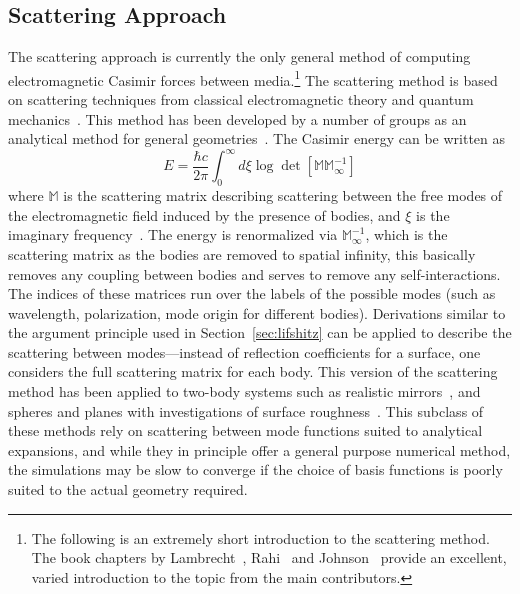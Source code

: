 \subsection{Scattering Approach}
\label{sec:scattering}
The scattering approach is currently the only general method of computing 
electromagnetic Casimir forces between media.\footnote{The following is an extremely short introduction to the scattering
method.  The book chapters by Lambrecht\etal~\cite{Lambrecht2011}, Rahi\etal~\cite{Rahi2011} and Johnson\etal~\cite{Johnson2011} 
provide an excellent, varied introduction to the topic from the main contributors.}
The scattering method 
is based on scattering techniques from classical electromagnetic theory and quantum mechanics~\cite{Rahi2009}.
This method has been developed by a number of groups as an analytical method for general geometries~\cite{Emig2004, Lambrecht2006,
Kenneth2006, Emig2007,
MaiaNeto2008,Canaguier-Durand2012,Rahi2009}.  
The Casimir energy can be written as 
\begin{equation}
  E = \frac{\hbar c}{2\pi}\int_{0}^\infty d\xi \log\det[\mathbb{M}\mathbb{M}^{-1}_{\infty}]
  \label{eq:scattering}
\end{equation}
where $\mathbb{M}$ is the scattering matrix describing scattering between the free modes of the electromagnetic
field induced by the presence of bodies, and $\xi$ is the imaginary frequency~\cite{Rahi2009}.
The energy is renormalized via $\mathbb{M}^{-1}_\infty$,
which is the scattering matrix as the bodies are removed to spatial infinity, this basically removes any
coupling between bodies and serves to remove any self-interactions. 
The indices of these matrices run over the labels of the possible modes (such as wavelength, polarization, mode origin for different bodies).
Derivations similar to the argument principle used in Section~\ref{sec:lifshitz} can be applied to describe the scattering 
between modes---instead of reflection coefficients for a surface, one considers the full scattering matrix for each body.
This version of the scattering method has been applied to two-body systems such as realistic mirrors~\cite{Lambrecht2006}, 
and spheres and planes with investigations of surface roughness~\cite{Canaguier-Durand2012}.   
This subclass of these methods rely on scattering between mode functions suited to analytical expansions,
 and while they in principle offer a general purpose numerical method, 
the simulations may be slow to converge if the choice of basis functions is poorly suited to the actual
geometry required.  

